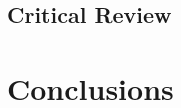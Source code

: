 \documentclass{article}
\begin{document}
\subsection{Critical Review}


\section{Conclusions}


\printbibliography
\end{document}
